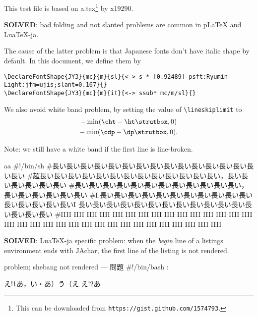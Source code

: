 \documentclass{jarticle}
\def\cs#1{\hbox{\texttt{\textbackslash #1}}}
\begin{document}
This test file is based on a.tex\footnote{This can be downloaded from {\tt https://gist.github.com/1574793}.} by x19290.


\textbf{SOLVED}: bad folding and not slanted problems are common in pLaTeX and LuaTeX-ja.

The cause of the latter problem is that Japanese fonts don't have italic shape by default.
In this document, we define them by
\begin{lstlisting}[language={[AlLaTeX]TeX}, basicstyle=\ttfamily]
\DeclareFontShape{JY3}{mc}{m}{sl}{<-> s * [0.92489] psft:Ryumin-Light:jfm=ujis;slant=0.167}{}
\DeclareFontShape{JY3}{mc}{m}{it}{<-> ssub* mc/m/sl}{}
\end{lstlisting}

\newpage

We also avoid white band problem, by setting the value of \cs{lineskiplimit} to
\begin{multline}
 -\min(\cs{cht}-\cs{ht}\cs{strutbox}, 0)\\
 -\min(\cs{cdp}-\cs{dp}\cs{strutbox}, 0).
\end{multline}

Note: we still have a white band if the first line is line-broken.

\begin{env}{\relax}aa
#!/bin/sh
#長い長い長い長い長い長い長い長い長い長い長い長い長い長い長い長い
#超長い長い長い長い長い長い長い長い長い長い長い長い長い，長い長い長い長い長い長い
#長い長い長い長い長い長い長い長い長い長い長い長い，長い長い長い長い長い長い
#I.長い長い長い長い長い長い長い長い長い長い長い長い長い長い長い長いI
長い長い長い長い長い長い長い長い長い長い長い長い長い長い長い長い
#IIII IIII IIII IIII IIII IIII IIII IIII IIII IIII IIII IIII IIII IIII IIII IIII
IIII IIII IIII IIII IIII IIII IIII IIII IIII IIII IIII IIII IIII IIII IIII IIII
\end{env}

\newpage

\textbf{SOLVED}: LuaTeX-ja specific problem:
when the \emph{begin} line of a listings environment ends with JAchar,
the first line of the listing is not rendered.

\begin{env}{problem; shebang not rendered --- 問題}
#!/bin/bash
:
\end{env}

\begin{LTXexample}[language=TeX]
え!1あ，い・あ）う（え
え!2あ
\end{LTXexample}
\end{document}
